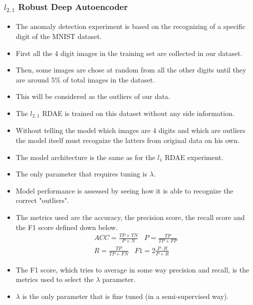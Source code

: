\documentclass{beamer}
\theoremstyle{plain}
\theoremstyle{definition}
\theoremstyle{remark}
\begin{document}
\begin{frame}
	\frametitle{$l_{2,1}$ Robust Deep Autoencoder}
	\begin{itemize}
		\item The anomaly detection experiment is based on the recognizing of a specific digit of the MNIST dataset.
		\item First all the $4$ digit images in the training set are collected in our dataset.
		\item Then, some images are chose at random from all the other digits until they are around $5\%$ of total images in the dataset.
		\item This will be considered as the outliers of our data.
	\end{itemize}
\end{frame}


\begin{frame}
	\begin{itemize}
		\item The $l_{2,1}$ RDAE is trained on this dataset without any side information.
		\item Without telling the model which images are $4$ digits and which are outliers the model itself must recognize the latters from original data on his own.
		\item The model architecture is the same as for the $l_1$ RDAE experiment.
		\item The only parameter that requires tuning is $\lambda$.
	\end{itemize}
\end{frame}

\begin{frame}
	\begin{itemize}
		\item Model performance is assessed by seeing how it is able to recognize the correct "outliers".
		\item The metrics used are the accuracy, the precision score, the recall score and the F1 score defined down below.
			\begin{align}
				ACC = \frac{TP+TN}{P+N}\;\;\; P = \frac{TP}{TP+FP}\\
				R = \frac{TP}{TP+FN} \;\;\; F1 = 2\frac{P\cdot R}{P+R}
			\end{align}
		\item The F1 score, which tries to average in some way precision and recall, is the metrics used to select the $\lambda$ parameter.
		\item $\lambda$ is the only parameter that is fine tuned (in a semi-supervised way).
	\end{itemize}
\end{frame}
\end{document}
